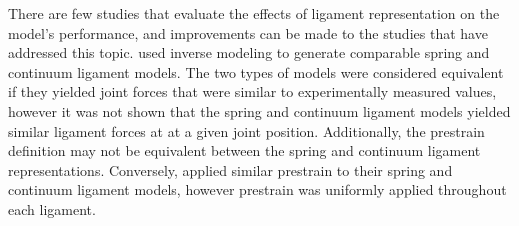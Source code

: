 There are few studies that evaluate the effects of ligament representation on the model's performance, and improvements can be made to the studies that have addressed this topic. \cite{beidokhti_influence_2017} used inverse modeling to generate comparable spring and continuum ligament models. The two types of models were considered equivalent if they yielded joint forces that were similar to experimentally measured values, however it was not shown that the spring and continuum ligament models yielded similar ligament forces at at a given joint position. Additionally, the prestrain definition may not be equivalent between the spring and continuum ligament representations. Conversely, \cite{orozco_effect_2018} applied similar prestrain to their spring and continuum ligament models, however prestrain was uniformly applied throughout each ligament.



